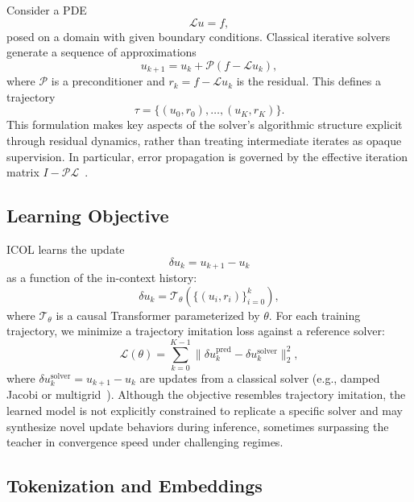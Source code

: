 \documentclass{article}
\begin{document}
Consider a PDE
\begin{equation}
\mathcal{L}u = f,
\end{equation}
posed on a domain with given boundary conditions. Classical iterative solvers generate a sequence of approximations
\begin{equation}
u_{k+1} = u_k + \mathcal{P}(f - \mathcal{L}u_k),
\end{equation}
where $\mathcal{P}$ is a preconditioner and $r_k = f - \mathcal{L}u_k$ is the residual. This defines a trajectory
\begin{equation}
\tau = \{(u_0, r_0), \ldots, (u_K, r_K)\}.
\end{equation}
This formulation makes key aspects of the solver's algorithmic structure explicit through residual dynamics, rather than treating intermediate iterates as opaque supervision. In particular, error propagation is governed by the effective iteration matrix $I - \mathcal{P}\mathcal{L}$~\cite{saad2003iterative}.

\subsection{Learning Objective}

ICOL learns the update
\begin{equation}
\delta u_k = u_{k+1} - u_k
\end{equation}
as a function of the in-context history:
\begin{equation}
\delta u_k = \mathcal{T}_\theta(\{(u_i, r_i)\}_{i=0}^k),
\end{equation}
where $\mathcal{T}_\theta$ is a causal Transformer parameterized by $\theta$. For each training trajectory, we minimize a trajectory imitation loss against a reference solver:
\begin{equation}
\mathcal{L}(\theta) = \sum_{k=0}^{K-1} \|\delta u_k^{\text{pred}} - \delta u_k^{\text{solver}}\|_2^2,
\end{equation}
where $\delta u_k^{\text{solver}} = u_{k+1} - u_k$ are updates from a classical solver (e.g., damped Jacobi or multigrid~\cite{briggs2000multigrid}). Although the objective resembles trajectory imitation, the learned model is not explicitly constrained to replicate a specific solver and may synthesize novel update behaviors during inference, sometimes surpassing the teacher in convergence speed under challenging regimes.

\subsection{Tokenization and Embeddings}
\end{document}
